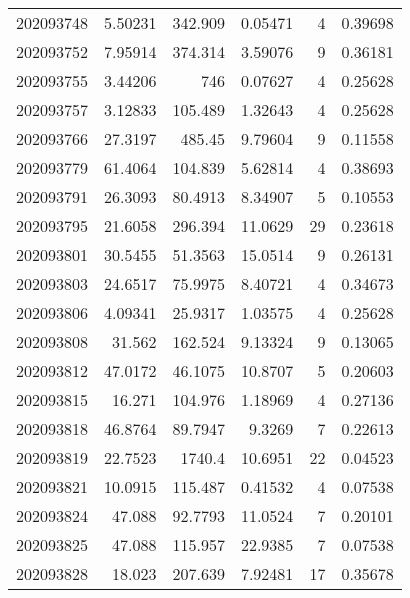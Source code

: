\begin{tabular}{rrrrrr}
 202093748 &          5.50231 &      342.909  &            0.05471 &           4 & 0.39698 \\
 202093752 &          7.95914 &      374.314  &            3.59076 &           9 & 0.36181 \\
 202093755 &          3.44206 &      746      &            0.07627 &           4 & 0.25628 \\
 202093757 &          3.12833 &      105.489  &            1.32643 &           4 & 0.25628 \\
 202093766 &         27.3197  &      485.45   &            9.79604 &           9 & 0.11558 \\
 202093779 &         61.4064  &      104.839  &            5.62814 &           4 & 0.38693 \\
 202093791 &         26.3093  &       80.4913 &            8.34907 &           5 & 0.10553 \\
 202093795 &         21.6058  &      296.394  &           11.0629  &          29 & 0.23618 \\
 202093801 &         30.5455  &       51.3563 &           15.0514  &           9 & 0.26131 \\
 202093803 &         24.6517  &       75.9975 &            8.40721 &           4 & 0.34673 \\
 202093806 &          4.09341 &       25.9317 &            1.03575 &           4 & 0.25628 \\
 202093808 &         31.562   &      162.524  &            9.13324 &           9 & 0.13065 \\
 202093812 &         47.0172  &       46.1075 &           10.8707  &           5 & 0.20603 \\
 202093815 &         16.271   &      104.976  &            1.18969 &           4 & 0.27136 \\
 202093818 &         46.8764  &       89.7947 &            9.3269  &           7 & 0.22613 \\
 202093819 &         22.7523  &     1740.4    &           10.6951  &          22 & 0.04523 \\
 202093821 &         10.0915  &      115.487  &            0.41532 &           4 & 0.07538 \\
 202093824 &         47.088   &       92.7793 &           11.0524  &           7 & 0.20101 \\
 202093825 &         47.088   &      115.957  &           22.9385  &           7 & 0.07538 \\
 202093828 &         18.023   &      207.639  &            7.92481 &          17 & 0.35678 \\

\end{tabular}
